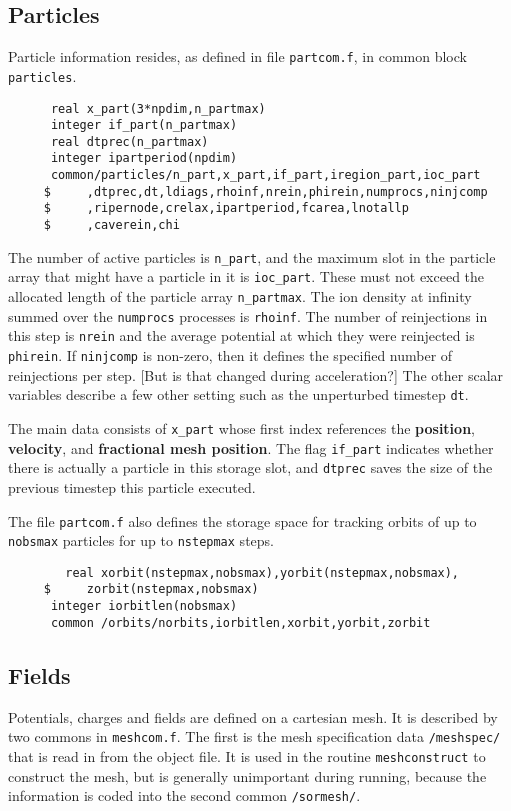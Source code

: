 \documentclass[12pt]{article}
\begin{document}
\subsection{Particles}

Particle information resides, as defined in file \verb!partcom.f!, in
common block \verb!particles!.
\begin{verbatim}
      real x_part(3*npdim,n_partmax)
      integer if_part(n_partmax)
      real dtprec(n_partmax)
      integer ipartperiod(npdim)
      common/particles/n_part,x_part,if_part,iregion_part,ioc_part
     $     ,dtprec,dt,ldiags,rhoinf,nrein,phirein,numprocs,ninjcomp
     $     ,ripernode,crelax,ipartperiod,fcarea,lnotallp
     $     ,caverein,chi
\end{verbatim}
The number of active particles is \verb!n_part!, and the maximum slot
in the particle array that might have a particle in it is
\verb!ioc_part!. These must not exceed the allocated length of the
particle array \verb!n_partmax!. The ion density at infinity summed over the
\verb!numprocs! processes is \verb!rhoinf!. The number of reinjections
in this step is \verb!nrein! and the average potential at which they
were reinjected is \verb!phirein!. If \verb!ninjcomp! is non-zero,
then it defines the specified number of reinjections per step. [But is
  that changed during acceleration?] 
The other scalar variables describe a few other setting such as the
unperturbed timestep \verb!dt!. 

The main data consists of \verb!x_part! whose first index references
the {\bf position}, {\bf velocity}, and {\bf fractional mesh
  position}. The flag \verb!if_part! indicates whether there is actually
a particle in this storage slot, and \verb!dtprec! saves the size of
the previous timestep this particle executed.

The file \verb!partcom.f! also defines the storage space for tracking
orbits of up to \verb!nobsmax! particles for up to \verb!nstepmax! steps.
\begin{verbatim}
        real xorbit(nstepmax,nobsmax),yorbit(nstepmax,nobsmax),
     $     zorbit(nstepmax,nobsmax)
      integer iorbitlen(nobsmax)
      common /orbits/norbits,iorbitlen,xorbit,yorbit,zorbit
\end{verbatim}


\subsection{Fields}

Potentials, charges and fields are defined on a cartesian mesh. It is
described by two commons in \verb!meshcom.f!. The first is the mesh
specification data \verb!/meshspec/! that is read in from the object file.
It is used in the routine \verb!meshconstruct! to construct the mesh,
but is generally unimportant during running, because the information
is coded into the second common \verb!/sormesh/!.
 
\end{document}
